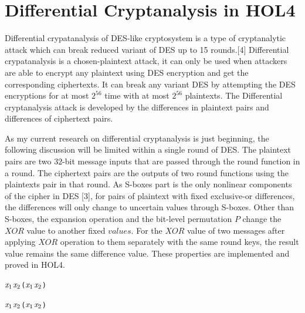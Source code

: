 \documentclass{article}
\begin{document}
\section{Differential Cryptanalysis in HOL4}
Differential crypatanalysis of DES-like cryptosystem is a type of cryptanalytic attack which can break reduced variant
of DES up to 15 rounds.[4] Differential crypatanalysis is a chosen-plaintext attack, it can only be used when attackers
are able to encrypt any plaintext using DES encryption and get the corresponding ciphertexts. It can break any variant DES
by attempting the DES encryptions for at most $2^{56}$ time with at most $2^{56}$ plaintexts. The Differential cryptanalysis
attack is developed by the differences in plaintext pairs and differences of ciphertext pairs.

As my current research on differential cryptanalysis is just beginning, the following discussion will be limited within
a single round of DES. The plaintext pairs are two 32-bit message inputs that are passed through the round function
in a round. The ciphertext pairs are the outputs of two round functions using the plaintexts pair in that round.
As S-boxes part is the only nonlinear components of the cipher in DES [3], for pairs of plaintext with fixed
exclusive-or differences, the differences will only change to uncertain values through S-boxes. Other than S-boxes,
the expansion operation and the bit-level permutation $P$ change the $XOR$ value to another fixed $values$. For the $XOR$ value
of two messages after applying $XOR$ operation to them separately with the same round keys, the result value remains the same
difference value. These properties are implemented and proved in HOL4.

\begin{alltt}
  \HOLTokenTurnstile{}  \ensuremath{\HOLFreeVar{x}\sb{\mathrm{1}}} \HOLSymConst{\HOLTokenEor{}}  \ensuremath{\HOLFreeVar{x}\sb{\mathrm{2}}} \HOLSymConst{=}  (\ensuremath{\HOLFreeVar{x}\sb{\mathrm{1}}} \HOLSymConst{\HOLTokenEor{}} \ensuremath{\HOLFreeVar{x}\sb{\mathrm{2}}})
\end{alltt}

\begin{alltt}
  \HOLTokenTurnstile{}  \ensuremath{\HOLFreeVar{x}\sb{\mathrm{1}}} \HOLSymConst{\HOLTokenEor{}}  \ensuremath{\HOLFreeVar{x}\sb{\mathrm{2}}} \HOLSymConst{=}  (\ensuremath{\HOLFreeVar{x}\sb{\mathrm{1}}} \HOLSymConst{\HOLTokenEor{}} \ensuremath{\HOLFreeVar{x}\sb{\mathrm{2}}})
\end{alltt}
\end{document}
